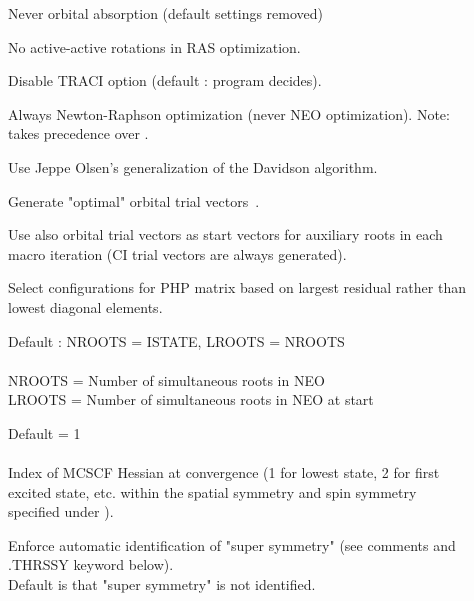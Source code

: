 \begin{description}
\item[]
  Never orbital absorption (default settings removed)

\item[]
  No active-active rotations in RAS optimization.

\item[]
  Disable TRACI option (default : program decides).

\item[]
  Always Newton-Raphson optimization (never NEO optimization).
  Note:  takes precedence over
  .

\item[]
  Use Jeppe Olsen's generalization of the Davidson
  algorithm.

\item[]
  Generate "optimal" orbital trial
  vectors~\cite{hjajpjhajcp87}. 

\item[]
  Use also orbital trial vectors as start vectors for auxiliary roots
  in each macro iteration (CI trial vectors are always generated).

\item[]
  Select configurations for PHP matrix based on largest residual
  rather than lowest diagonal elements.

\item[]
  Default : NROOTS = ISTATE, LROOTS = NROOTS\\
   \\
  NROOTS = Number of simultaneous roots in NEO\\
  LROOTS = Number of simultaneous roots in NEO at start

\item[]
  Default = 1\\
   \\
  Index of MCSCF Hessian at convergence (1 for
  lowest state, 2 for first
  excited state, etc. within the spatial symmetry and
  spin symmetry
  specified under ).

\item[]
  Enforce automatic identification of "super symmetry"
   (see comments and .THRSSY keyword below).\\
  Default is that "super symmetry" is not identified.


\end{description}
